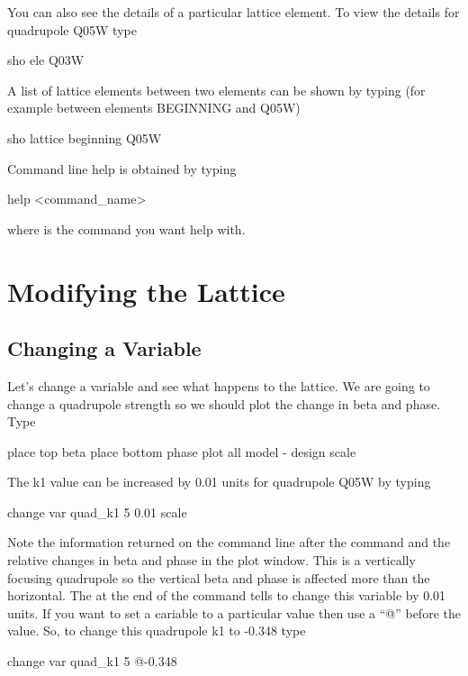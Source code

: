 You can also see the details of a particular lattice element. To view the details
for quadrupole Q05W type
\begin{example}
  sho ele Q03W
\end{example}

A list of lattice elements between two elements can be shown by typing (for
example between elements BEGINNING and Q05W)
\begin{example}
  sho lattice beginning Q05W
\end{example}

Command line help is obtained by typing
\begin{example}
  help <command\_name>
\end{example}
where  is the command you want help with.

\section{Modifying the Lattice}
\label{s:modify_lattice}

\subsection{Changing a Variable}
\label{ss:put_it_back}

Let's change a variable and see what happens to the lattice. We are going to
change a quadrupole strength so we should plot the change in beta and phase.
Type
\begin{example}
  place top beta
  place bottom phase
  plot all model - design
  scale
\end{example}

The k1 value can be increased by 0.01 units for quadrupole Q05W by typing
\begin{example}
  change var quad\_k1 5 0.01
  scale
\end{example}
Note the information returned on the command line after the command and the relative changes in
beta and phase in the plot window. This is a vertically focusing quadrupole so
the vertical beta and phase is affected more than the horizontal. The 
at the end of the command tells \tao to change this variable by 0.01 units. If
you want to set a cariable to a particular value then use a ``@'' before the
value. So, to change this quadrupole k1 to -0.348 type
\begin{example}
  change var quad\_k1 5 @-0.348
\end{example}

